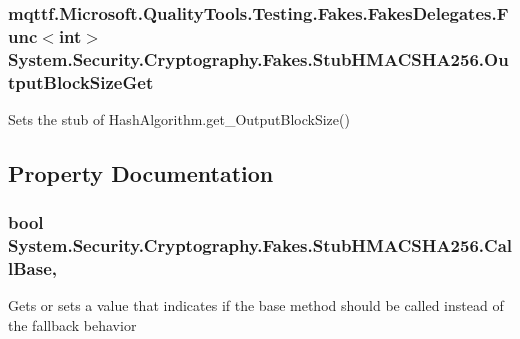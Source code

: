 \hypertarget{class_system_1_1_security_1_1_cryptography_1_1_fakes_1_1_stub_h_m_a_c_s_h_a256_a962d4ba7702654fcf2862da6fe3b97e5}{
\subsubsection[{Output\-Block\-Size\-Get}]{\setlength{\rightskip}{0pt plus 5cm}mqttf.\-Microsoft.\-Quality\-Tools.\-Testing.\-Fakes.\-Fakes\-Delegates.\-Func$<$int$>$ System.\-Security.\-Cryptography.\-Fakes.\-Stub\-H\-M\-A\-C\-S\-H\-A256.\-Output\-Block\-Size\-Get}}\label{class_system_1_1_security_1_1_cryptography_1_1_fakes_1_1_stub_h_m_a_c_s_h_a256_a962d4ba7702654fcf2862da6fe3b97e5}


Sets the stub of Hash\-Algorithm.\-get\-\_\-\-Output\-Block\-Size()



\subsection{Property Documentation}
\hypertarget{class_system_1_1_security_1_1_cryptography_1_1_fakes_1_1_stub_h_m_a_c_s_h_a256_a42688d054f289da56c484bf02a264807}{
\subsubsection[{Call\-Base}]{\setlength{\rightskip}{0pt plus 5cm}bool System.\-Security.\-Cryptography.\-Fakes.\-Stub\-H\-M\-A\-C\-S\-H\-A256.\-Call\-Base\hspace{0.3cm}{\ttfamily [get]}, {\ttfamily [set]}}}\label{class_system_1_1_security_1_1_cryptography_1_1_fakes_1_1_stub_h_m_a_c_s_h_a256_a42688d054f289da56c484bf02a264807}


Gets or sets a value that indicates if the base method should be called instead of the fallback behavior

